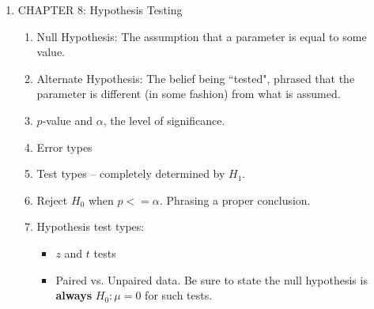 \documentclass{article}
\begin{document}
\begin{enumerate}
\begin{enumerate}
\begin{itemize}
                \end{itemize}
                
        \end{enumerate}
        
\newpage

    \item CHAPTER 8: Hypothesis Testing
    
        \begin{enumerate}
        
            \item Null Hypothesis: The assumption that a parameter is equal to some value.
            
            \item Alternate Hypothesis: The belief being ``tested", phrased that the parameter is different (in some fashion) from what is assumed.
            
            \item $p$-value and $\alpha$, the level of significance.
            
            \item Error types
            
            \item Test types -- completely determined by $H_1$.
            
            \item Reject $H_0$ when $p <= \alpha$. Phrasing a proper conclusion.
            
            \item Hypothesis test types:
            
                \begin{itemize}
                
                \item $z$ and $t$ tests
                
                \item Paired vs. Unpaired data. Be sure to state the null hypothesis is \textbf{always} $H_0: \mu = 0$ for such tests.
                
                \end{itemize}
                
        \end{enumerate}
        
\end{enumerate}
\end{document}
